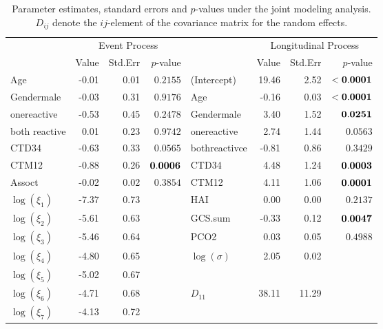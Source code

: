 \documentclass{article}
\begin{document}
\begin{table}[H]
\centering
\begin{tabular}{lrrrlrrr}
  \hline
  & \multicolumn{3}{c}{Event Process} & & \multicolumn{3}{c}{Longitudinal Process}\\
  & Value & Std.Err & $p$-value &   & Value & Std.Err & $p$-value \\ 
  \hline
Age & -0.01 & 0.01 & $0.2155$ & (Intercept) & 19.46 & 2.52 & ${\bf <0.0001}$ \\ 
  Gendermale & -0.03 & 0.31 & $0.9176$ & Age & -0.16 & 0.03 & ${\bf <0.0001}$ \\ 
  onereactive & -0.53 & 0.45 & $0.2478$ & Gendermale & 3.40 & 1.52 & ${\bf 0.0251}$ \\ 
  both reactive & 0.01 & 0.23 & $0.9742$ & onereactive & 2.74 & 1.44 & $0.0563$ \\ 
  CTD34 & -0.63 & 0.33 & $0.0565$ & bothreactivce & -0.81 & 0.86 & $0.3429$ \\ 
  CTM12 & -0.88 & 0.26 & ${\bf 0.0006}$ & CTD34 & 4.48 & 1.24 & ${\bf 0.0003}$ \\ 
  Assoct & -0.02 & 0.02 & $0.3854$ & CTM12 & 4.11 & 1.06 & ${\bf 0.0001}$ \\ 
  $\log(\xi_1)$ & -7.37 & 0.73 &  & HAI & 0.00 & 0.00 & $0.2137$ \\ 
  $\log(\xi_2)$ & -5.61 & 0.63 &  & GCS.sum & -0.33 & 0.12 & ${\bf 0.0047}$ \\ 
  $\log(\xi_3)$ & -5.46 & 0.64 &  & PCO2 & 0.03 & 0.05 & $0.4988$ \\ 
  $\log(\xi_4)$ & -4.80 & 0.65 &  & $\log(\sigma)$ & 2.05 & 0.02 &  \\ 
  $\log(\xi_5)$ & -5.02 & 0.67 &  &  &  &  &  \\ 
  $\log(\xi_6)$ & -4.71 & 0.68 &  & $D_{11}$ & 38.11 & 11.29 &  \\ 
  $\log(\xi_7)$ & -4.13 & 0.72&  &  &  &  &  \\ 
   \hline
\end{tabular}
\caption{Parameter estimates, standard errors and $p$-values under the joint modeling analysis. $D_{ij}$ denote the $ij$-element of the covariance matrix for the random effects.} 
\label{tab: jm}
\end{table}
\end{document}
